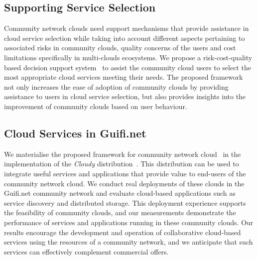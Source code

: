 \subsection{Supporting Service Selection} 
\label{sec__service_selection}

Community network clouds need support mechanisms that provide assistance 
in cloud service selection while taking into account 
different aspects pertaining to associated risks in community clouds, 
quality concerns of the users and cost limitations specifically in multi-clouds ecosystems. 
We propose a risk-cost-quality based decision support system~\cite{Khan2015DSS} 
to assist the community cloud users to select the most appropriate cloud services meeting their needs. 
The proposed framework not only increases the ease of adoption of community clouds 
by providing assistance to users in cloud service selection, 
but also provides insights into the improvement of community clouds based on user behaviour.


\subsection{Cloud Services in Guifi.net}
\label{sec__cloud_services_background}

We materialise the proposed framework for community network cloud~\cite{Jimenez2013, Freitag2014Energy, Baig2015Community, Selimi2015Cloud, Khan2015Enabling}
in the implementation of the \emph{Cloudy} distribution~\cite{Cloudy}. 
This distribution can be used to integrate useful services and applications 
that provide value to end-users of the community network cloud.
We conduct real deployments of these clouds in the Guifi.net community network 
and evaluate cloud-based applications such as service discovery and distributed storage. 
This deployment experience supports the feasibility of community clouds, 
and our measurements demonstrate the performance of services and applications running in these community clouds. 
Our results encourage the development and operation of collaborative cloud-based services 
using the resources of a community network, 
and we anticipate that such services can effectively complement commercial offers.




